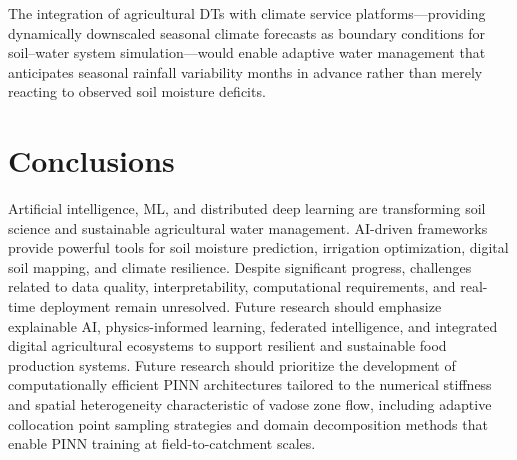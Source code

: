 \documentclass[land,review,accept,pdftex,oneauthor]{Definitions/mdpi}
\begin{document}
The integration of agricultural DTs with climate service platforms---providing dynamically downscaled seasonal climate forecasts as boundary conditions for soil--water system simulation---would enable adaptive water management that anticipates seasonal rainfall variability months in advance rather than merely reacting to observed soil moisture deficits.

\section{{Conclusions}}\label{sec10}
Artificial intelligence, ML, and distributed deep learning are transforming soil science and sustainable agricultural water management. AI-driven frameworks provide powerful tools for soil moisture prediction, irrigation optimization, digital soil mapping, and climate resilience. Despite significant progress, challenges related to data quality, interpretability, computational requirements, and real-time deployment remain unresolved. Future research should emphasize explainable AI, physics-informed learning, federated intelligence, and integrated digital agricultural ecosystems to support resilient and sustainable food production systems. Future research should prioritize the development of computationally efficient PINN architectures tailored to the numerical stiffness and spatial heterogeneity characteristic of vadose zone flow, including adaptive collocation point sampling strategies and domain decomposition methods that enable PINN training at field-to-catchment scales.  %





\end{document}
